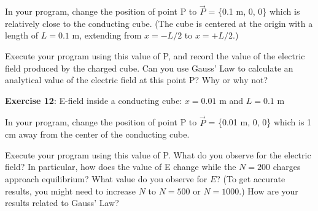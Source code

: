 \documentclass[]{article}
\begin{document}
In your program, change the position of point P to \(\vec{P}\) = \{0.1
m, 0, 0\} which is relatively close to the conducting cube. (The cube is
centered at the origin with a length of \(L = 0.1\) m, extending from
\(x = -L/2\) to \(x = +L/2\).)

Execute your program using this value of P, and record the value of the
electric field produced by the charged cube. Can you use Gauss' Law to
calculate an analytical value of the electric field at this point P? Why
or why not?

\textbf{Exercise 12}: E-field inside a conducting cube: \(x = 0.01\) m
and \(L = 0.1\) m

In your program, change the position of point P to \(\vec{P}\) = \{0.01
m, 0, 0\} which is 1 cm away from the center of the conducting cube.

Execute your program using this value of P. What do you observe for the
electric field? In particular, how does the value of E change while the
\(N = 200\) charges approach equilibrium? What value do you observe for
\(E\)? (To get accurate results, you might need to increase \(N\) to
\(N = 500\) or \(N = 1000\).) How are your results related to Gauss'
Law?
\end{document}
